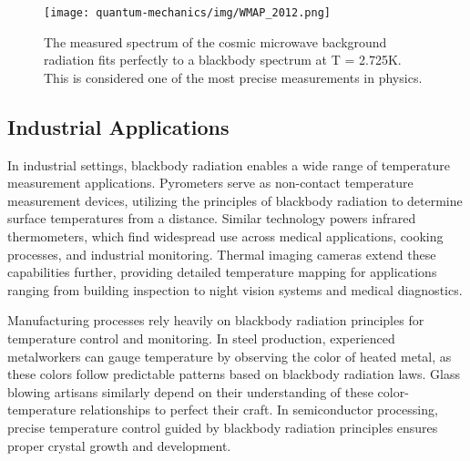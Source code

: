 \documentclass[
  a4paper,
]{book}
\begin{document}
\begin{tcolorbox}
\begin{figure}[H]
\begin{minipage}{0.50\linewidth}
\end{minipage}%
%
\begin{minipage}{0.50\linewidth}

\texttt{[image: quantum-mechanics/img/WMAP\_2012.png]}

\end{minipage}%

\caption{\label{fig-cmb}The measured spectrum of the cosmic microwave
background radiation fits perfectly to a blackbody spectrum at T =
2.725K. This is considered one of the most precise measurements in
physics.}

\end{figure}%

\subsection{Industrial Applications}\label{industrial-applications}

In industrial settings, blackbody radiation enables a wide range of
temperature measurement applications. Pyrometers serve as non-contact
temperature measurement devices, utilizing the principles of blackbody
radiation to determine surface temperatures from a distance. Similar
technology powers infrared thermometers, which find widespread use
across medical applications, cooking processes, and industrial
monitoring. Thermal imaging cameras extend these capabilities further,
providing detailed temperature mapping for applications ranging from
building inspection to night vision systems and medical diagnostics.

Manufacturing processes rely heavily on blackbody radiation principles
for temperature control and monitoring. In steel production, experienced
metalworkers can gauge temperature by observing the color of heated
metal, as these colors follow predictable patterns based on blackbody
radiation laws. Glass blowing artisans similarly depend on their
understanding of these color-temperature relationships to perfect their
craft. In semiconductor processing, precise temperature control guided
by blackbody radiation principles ensures proper crystal growth and
development.

\begin{figure}[H]

\centering{

}
\end{figure}
\end{tcolorbox}
\end{document}

